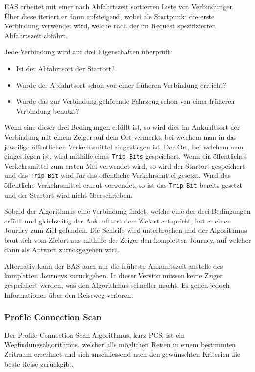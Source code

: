 EAS arbeitet mit einer nach Abfahrtszeit sortierten Liste von Verbindungen. Über diese iteriert er dann aufsteigend, wobei als Startpunkt die erste Verbindung verwendet wird, welche nach der im Request spezifizierten Abfahrtszeit abfährt. \newline

Jede Verbindung wird auf drei Eigenschaften überprüft:
\begin{itemize}
	\item Ist der Abfahrtsort der Startort?
	\item Wurde der Abfahrtsort schon von einer früheren Verbindung erreicht?
	\item Wurde das zur Verbindung gehörende Fahrzeug schon von einer früheren Verbindung benutzt?
\end{itemize}

Wenn eine dieser drei Bedingungen erfüllt ist, so wird dies im Ankunftsort der Verbindung mit einem Zeiger auf dem Ort vermerkt, bei welchem man in das jeweilige öffentlichen Verkehrsmittel eingestiegen ist. Der Ort, bei welchem man eingestiegen ist, wird mithilfe eines \texttt{Trip-Bits} gespeichert. Wenn ein öffentliches Verkehrsmittel zum ersten Mal verwendet wird, so wird der Startort gespeichert und das \texttt{Trip-Bit} wird für das öffentliche Verkehrsmittel gesetzt. Wird das öffentliche Verkehrsmittel erneut verwendet, so ist das \texttt{Trip-Bit} bereits gesetzt und der Startort wird nicht überschrieben. \newline

Sobald der Algorithmus eine Verbindung findet, welche eine der drei Bedingungen erfüllt und gleichzeitig der Ankunftsort dem Zielort entspricht, hat er einen Journey zum Ziel gefunden. Die Schleife wird unterbrochen und der Algorithmus baut sich vom Zielort aus mithilfe der Zeiger den kompletten Journey, auf welcher dann als Antwort zurückgegeben wird. \newline

Alternativ kann der EAS auch nur die früheste Ankunftszeit anstelle des kompletten Journeys zurückgeben. In dieser Version müssen keine Zeiger gespeichert werden, was den Algorithmus schneller macht. Es gehen jedoch Informationen über den Reiseweg verloren.

\subsubsection{Profile Connection Scan}
Der \hypertarget{PCS}{Profile Connection Scan Algorithmus}\cite{csa}, kurz PCS, ist ein Wegfindungsalgorithmus, welcher alle möglichen Reisen in einem bestimmten Zeitraum errechnet und sich anschliessend nach den gewünschten Kriterien die  beste Reise zurückgibt. \newline


